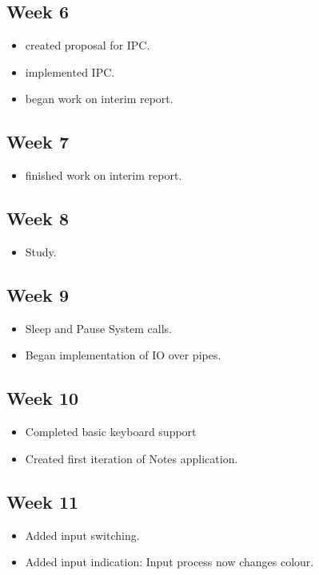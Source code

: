 \documentclass[a4paper]{report}
\begin{document}
\subsection*{Week 6}
\begin{itemize}
\item created proposal for IPC.
\item implemented IPC.
\item began work on interim report.
\end{itemize}

\subsection*{Week 7}
\begin{itemize}
\item finished work on interim report.
\end{itemize}

\subsection*{Week 8}
\begin{itemize}
\item Study.
\end{itemize}

\subsection*{Week 9}
\begin{itemize}
\item Sleep and Pause System calls.
\item Began implementation of IO over pipes.
\end{itemize}

\subsection*{Week 10}
\begin{itemize}
\item Completed basic keyboard support
\item Created first iteration of Notes application.
\end{itemize}

\subsection*{Week 11}
\begin{itemize}
\item Added input switching.
\item Added input indication: Input process now changes colour.
\end{itemize}
\end{document}
